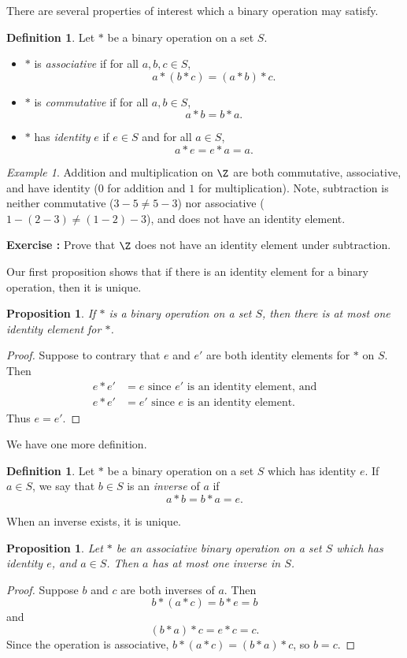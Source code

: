 \documentclass[12pt]{amsart}
\newcounter{probs}
\newenvironment{prob}{%
  \refstepcounter{probs}
  \par\medskip\noindent\textbf{Exercise \theprobs:} }{\par\medskip}
\theoremstyle{plain}
\newtheorem{prop}[thm]{Proposition}
\theoremstyle{definition}
\newtheorem{defn}[thm]{Definition}
\theoremstyle{remark}
\newtheorem*{exam}{Example}
\begin{document}
There are several properties of interest which a binary operation may
satisfy.
\begin{defn}
  Let $*$ be a binary operation on a set $S$.
\begin{itemize}
\item  $*$ is \emph{associative} if for all
  $a,b,c\in S$,
  \[ a*(b*c)=(a*b)*c.\]
\item $*$ is \emph{commutative} if for all $a,b\in S$,
  \[ a*b = b*a.\]
\item $*$ has \emph{identity} $e$ if $e\in S$ and for all $a\in S$,
  \[ a*e=e*a=a.\]
\end{itemize} 
\end{defn}

\begin{exam}
Addition and multiplication on $\Z$ are both commutative,
associative, and have identity ($0$ for addition and $1$ for
multiplication).  Note, subtraction is neither commutative ($3-5\neq
5-3$) nor associative ($1-(2-3)\neq (1-2)-3$), and does not have an
identity element.
\end{exam}

\begin{prob}
Prove that $\Z$ does not have an identity element under subtraction.
\end{prob}

Our first proposition shows that if there is an identity element for a
binary operation, then it is unique.
\begin{prop} \label{unique-identity}
  If $*$ is a binary operation on a set $S$, then there is at most one
  identity element for $*$.
\end{prop}
\begin{proof}
  Suppose to contrary that $e$ and $e'$ are both identity elements
  for $*$ on $S$.  Then
  \begin{align*}
    e*e' &= e \text{ since $e'$ is an identity element, and} \\
    e*e' &= e' \text{ since $e$ is an identity element.}
  \end{align*}
  Thus $e=e'$.
\end{proof}
We have one more definition.
\begin{defn}
  Let $*$ be a binary operation on a set $S$ which has identity $e$.
  If $a\in S$, we say that $b\in S$ is an \emph{inverse} of $a$ if
  \[ a*b=b*a=e.\]
\end{defn}
When an inverse exists, it is unique.
\begin{prop} \label{unique-inverse}
  Let $*$ be an associative binary operation on a set $S$ which has
  identity $e$, and $a\in S$.  Then $a$ has at most one inverse in
  $S$.
\end{prop}
\begin{proof}
  Suppose $b$ and $c$ are both inverses of $a$.  Then
\[ b*(a*c) = b*e= b\]
and
\[ (b*a)*c = e*c=c.\]
Since the operation is associative, $b*(a*c)=(b*a)*c$, so $b=c$.
\end{proof}
\end{document}
